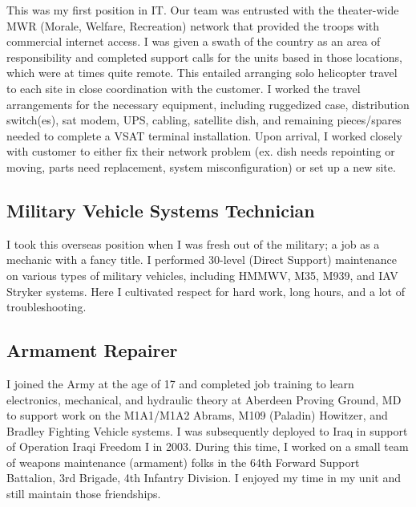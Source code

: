 \documentclass{article}
\begin{document}
{\noindent}This was my first position in IT. Our team was entrusted with the theater-wide MWR (Morale, Welfare, Recreation) network that provided the troops with commercial internet access. I was given a swath of the country as an area of responsibility and completed support calls for the units based in those locations, which were at times quite remote. This entailed arranging solo helicopter travel to each site in close coordination with the customer. I worked the travel arrangements for the necessary equipment, including ruggedized case, distribution switch(es), sat modem, UPS, cabling, satellite dish, and remaining pieces/spares needed to complete a VSAT terminal installation. Upon arrival, I worked closely with customer to either fix their network problem (ex. dish needs repointing or moving, parts need replacement, system misconfiguration) or set up a new site.
\\\subsection { Military Vehicle Systems Technician }

{\noindent}I took this overseas position when I was fresh out of the military; a job as a mechanic with a fancy title. I performed 30-level (Direct Support) maintenance on various types of military vehicles, including HMMWV, M35, M939, and IAV Stryker systems. Here I cultivated respect for hard work, long hours, and a lot of troubleshooting.
\\\subsection { Armament Repairer }

{\noindent}I joined the Army at the age of 17 and completed job training to learn electronics, mechanical, and hydraulic theory at Aberdeen Proving Ground, MD to support work on the M1A1/M1A2 Abrams, M109 (Paladin) Howitzer, and Bradley Fighting Vehicle systems. I was subsequently deployed to Iraq in support of Operation Iraqi Freedom I in 2003. During this time, I worked on a small team of weapons maintenance (armament) folks in the 64th Forward Support Battalion, 3rd Brigade, 4th Infantry Division. I enjoyed my time in my unit and still maintain those friendships.
\\
\end{document}
